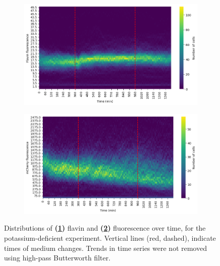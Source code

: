\begin{figure}
  \centering
  \begin{subfigure}[htpb]{0.8\textwidth}
   \centering
   \includegraphics[width=\textwidth]{613_distribs_flavin.png}
   \caption{
   }
   \label{fig:biology-kdeficient-histogram-flavin}
  \end{subfigure}

  \begin{subfigure}[htpb]{0.8\textwidth}
   \centering
   \includegraphics[width=\textwidth]{613_distribs_mCherry.png}
   \caption{
   }
   \label{fig:biology-kdeficient-histogram-mCherry}
  \end{subfigure}

  \caption{
    Distributions of \textbf{(\ref{fig:biology-kdeficient-histogram-flavin})} flavin and \textbf{(\ref{fig:biology-kdeficient-histogram-mCherry})} fluorescence over time, for the potassium-deficient experiment.
    Vertical lines (red, dashed), indicate times of medium changes.
    Trends in time series were not removed using high-pass Butterworth filter.
  }
  \label{fig:biology-kdeficient-histogram}
\end{figure}

